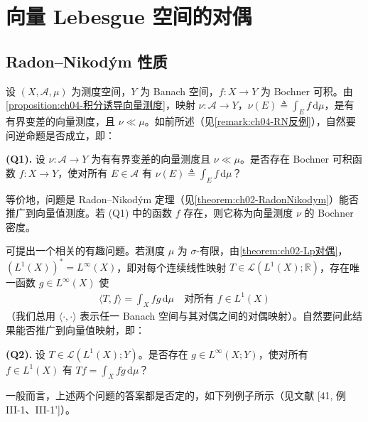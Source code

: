 \documentclass[../../main.tex]{subfiles}%
\begin{document}
\section{向量 Lebesgue 空间的对偶}\label{section:ch04-对偶}

\subsection{Radon--Nikodým 性质}\label{subsection:ch04-RNP}

设 $(X,\mathcal{A},\mu)$ 为测度空间，$Y$ 为 Banach 空间，$f:X\to Y$ 为 Bochner 可积。由\cref{proposition:ch04-积分诱导向量测度}，映射 $\nu:\mathcal{A}\to Y$，$\nu(E)\triangleq \int_E f\,\mathrm{d}\mu$，是有有界变差的向量测度，且 $\nu\ll\mu$。如前所述（见\cref{remark:ch04-RN反例}），自然要问逆命题是否成立，即：

\noindent\textbf{(Q1).} 设 $\nu:\mathcal{A}\to Y$ 为有有界变差的向量测度且 $\nu\ll\mu$。是否存在 Bochner 可积函数 $f:X\to Y$，使对所有 $E\in\mathcal{A}$ 有 $\nu(E)\triangleq \int_E f\,\mathrm{d}\mu$？

等价地，问题是 Radon--Nikodým 定理（见\cref{theorem:ch02-RadonNikodym}）能否推广到向量值测度。若 (Q1) 中的函数 $f$ 存在，则它称为向量测度 $\nu$ 的 Bochner 密度。

可提出一个相关的有趣问题。若测度 $\mu$ 为 $\sigma$-有限，由\cref{theorem:ch02-Lp对偶}，$(L^1(X))^*=L^\infty(X)$，即对每个连续线性映射 $T\in\mathcal{L}(L^1(X);\mathbb{R})$，存在唯一函数 $g\in L^\infty(X)$ 使
\begin{align*}
\langle T,f\rangle=\int_X fg\,\mathrm{d}\mu\quad\text{对所有 }f\in L^1(X)
\end{align*}
（我们总用 $\langle\cdot,\cdot\rangle$ 表示任一 Banach 空间与其对偶之间的对偶映射）。自然要问此结果能否推广到向量值映射，即：

\noindent\textbf{(Q2).} 设 $T\in\mathcal{L}(L^1(X);Y)$。是否存在 $g\in L^\infty(X;Y)$，使对所有 $f\in L^1(X)$ 有 $Tf=\int_X fg\,\mathrm{d}\mu$？

一般而言，上述两个问题的答案都是否定的，如下列例子所示（见文献 [41, 例 III-1、III-1']）。
\end{document}
